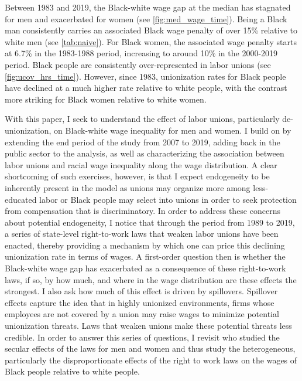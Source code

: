 \documentclass[11pt]{article}
\begin{document}
Between 1983 and 2019, the Black-white wage gap at the median has stagnated for men and exacerbated for women (see \autoref{fig:med_wage_time}). Being a Black man consistently carries an associated Black wage penalty of over 15\% relative to white men (see \autoref{tab:naive}). For Black women, the associated wage penalty starts at 6.7\% in the 1983-1988 period, increasing to around 10\% in the 2000-2019 period. Black people are consistently over-represented in labor unions (see \autoref{fig:ucov_hrs_time}). However, since 1983, unionization rates for Black people have declined at a much higher rate relative to white people, with the contrast more striking for Black women relative to white women. 

With this paper, I seek to understand the effect of labor unions, particularly de-unionization, on Black-white wage inequality for men and women. I build on \citet{rosenfeldkleykamp2012} by extending the end period of the study from 2007 to 2019, adding back in the public sector to the analysis, as well as characterizing the association between labor unions and racial wage inequality along the wage distribution. A clear shortcoming of such exercises, however, is that I expect endogeneity to be inherently present in the model as unions may organize more among less-educated labor or Black people may select into unions in order to seek protection from compensation that is discriminatory. In order to address these concerns about potential endogeneity, I notice that through the period from 1989 to 2019, a series of state-level right-to-work laws that weaken labor unions have been enacted, thereby providing a mechanism by which one can price this declining unionization rate in terms of wages. A first-order question then is whether the Black-white wage gap has exacerbated as a consequence of these right-to-work laws, if so, by how much, and where in the wage distribution are these effects the strongest. I also ask how much of this effect is driven by spillovers. Spillover effects capture the idea that in highly unionized environments, firms whose employees are not covered by a union may raise wages to minimize potential unionization threats. Laws that weaken unions make these potential threats less credible. In order to answer this series of questions, I revisit \citet{fll2018} who studied the secular effects of the laws for men and women and thus study the heterogeneous, particularly the disproportionate effects of the right to work laws on the wages of Black people relative to white people. 
\end{document}
